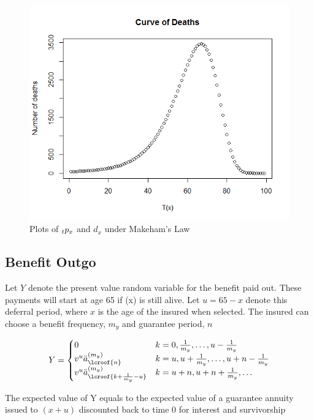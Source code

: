 \documentclass[12pt]{article}
\begin{document}
\begin{figure}[!ht]
\centering
\includegraphics[scale=0.4]{images/makehamsdeaths}
\caption{Plots of $\hspace{0mm}_tp_x$ and $d_x$ under Makeham's Law}
\end{figure}

\subsection*{Benefit Outgo}

Let $Y$ denote the present value random variable for the benefit paid out. These payments will start at age 65 if (x) is still alive. Let $u=65-x$ denote this deferral period, where $x$ is the age of the insured when selected. The insured can choose a benefit frequency, $m_y$ and guarantee period, $n$

\begin{align*}
Y =
\begin{cases}
0 & k=0,\frac{1}{m_y},\dots{}, u-\frac{1}{m_y} \\
v^u\ddot{a}_{\lcroof{n}}^{(m_y)} & k=u,u+\frac{1}{m_y},\dots{},u+n-\frac{1}{m_y} \\
v^u\ddot{a}_{\lcroof{k+\frac{1}{m_y}-u}}^{(m_y)} & k = u+n,u+n+\frac{1}{m_y}, \dots{}
\end{cases}
\end{align*}

The expected value of Y equals to the expected value of a guarantee annuity issued to $(x+u)$ discounted back to time 0 for interest and survivorship
\end{document}
